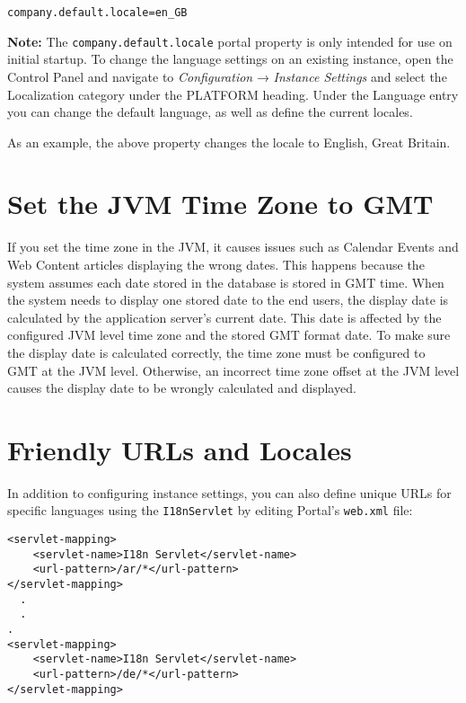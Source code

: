 \begin{verbatim}
company.default.locale=en_GB 
\end{verbatim}

\noindent\hrulefill

\textbf{Note:} The \texttt{company.default.locale} portal property is
only intended for use on initial startup. To change the language
settings on an existing instance, open the Control Panel and navigate to
\emph{Configuration} → \emph{Instance Settings} and select the
Localization category under the PLATFORM heading. Under the Language
entry you can change the default language, as well as define the current
locales.

\noindent\hrulefill

As an example, the above property changes the locale to English, Great
Britain.

\section{Set the JVM Time Zone to
GMT}\label{set-the-jvm-time-zone-to-gmt}

If you set the time zone in the JVM, it causes issues such as Calendar
Events and Web Content articles displaying the wrong dates. This happens
because the system assumes each date stored in the database is stored in
GMT time. When the system needs to display one stored date to the end
users, the display date is calculated by the application server's
current date. This date is affected by the configured JVM level time
zone and the stored GMT format date. To make sure the display date is
calculated correctly, the time zone must be configured to GMT at the JVM
level. Otherwise, an incorrect time zone offset at the JVM level causes
the display date to be wrongly calculated and displayed.

\section{Friendly URLs and Locales}\label{friendly-urls-and-locales}

In addition to configuring instance settings, you can also define unique
URLs for specific languages using the \texttt{I18nServlet} by editing
Portal's \texttt{web.xml} file:

\begin{verbatim}
<servlet-mapping>
    <servlet-name>I18n Servlet</servlet-name>
    <url-pattern>/ar/*</url-pattern>
</servlet-mapping>
  .
  .
.
<servlet-mapping>
    <servlet-name>I18n Servlet</servlet-name>
    <url-pattern>/de/*</url-pattern>
</servlet-mapping>
\end{verbatim}

